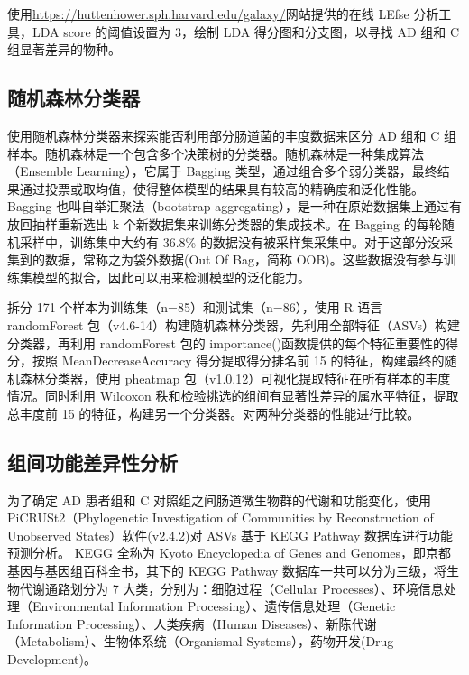 \documentclass[supercite]{HustGraduPaper}
\begin{document}
使用\href{https://huttenhower.sph.harvard.edu/galaxy/}{https://huttenhower.sph.harvard.edu/galaxy/}网站提供的在线 LEfse 分析工具，LDA score 的阈值设置为 3，绘制 LDA 得分图和分支图，以寻找 AD 组和 C 组显著差异的物种。

\subsection{随机森林分类器}

使用随机森林分类器来探索能否利用部分肠道菌的丰度数据来区分 AD 组和 C 组样本。随机森林是一个包含多个决策树的分类器\cite{liaw2002classification}。随机森林是一种集成算法（Ensemble Learning），它属于 Bagging 类型，通过组合多个弱分类器，最终结果通过投票或取均值，使得整体模型的结果具有较高的精确度和泛化性能。Bagging 也叫自举汇聚法（bootstrap aggregating），是一种在原始数据集上通过有放回抽样重新选出 k 个新数据集来训练分类器的集成技术。在 Bagging 的每轮随机采样中，训练集中大约有 36.8\% 的数据没有被采样集采集中。对于这部分没采集到的数据，常称之为袋外数据(Out Of Bag，简称 OOB)。这些数据没有参与训练集模型的拟合，因此可以用来检测模型的泛化能力。

拆分 171 个样本为训练集（n=85）和测试集（n=86），使用 R 语言 randomForest 包\cite{liaw2002classification}（v4.6-14）构建随机森林分类器，先利用全部特征（ASVs）构建分类器，再利用 randomForest 包的 importance()函数提供的每个特征重要性的得分，按照 MeanDecreaseAccuracy 得分提取得分排名前 15 的特征，构建最终的随机森林分类器，使用 pheatmap 包\cite{kolde2015package}（v1.0.12）可视化提取特征在所有样本的丰度情况。同时利用 Wilcoxon 秩和检验挑选的组间有显著性差异的属水平特征，提取总丰度前 15 的特征，构建另一个分类器。对两种分类器的性能进行比较。

\subsection{组间功能差异性分析}

为了确定 AD 患者组和 C 对照组之间肠道微生物群的代谢和功能变化，使用 PiCRUSt2（Phylogenetic Investigation of Communities by Reconstruction of Unobserved States）软件(v2.4.2)\cite{douglas2020picrust2}对 ASVs 基于 KEGG Pathway 数据库进行功能预测分析。 KEGG 全称为 Kyoto Encyclopedia of Genes and Genomes，即京都基因与基因组百科全书\cite{kanehisa2000kegg}，其下的 KEGG Pathway 数据库一共可以分为三级，将生物代谢通路划分为 7 大类，分别为：细胞过程（Cellular Processes）、环境信息处理（Environmental Information Processing）、遗传信息处理（Genetic Information Processing）、人类疾病（Human Diseases）、新陈代谢（Metabolism）、生物体系统（Organismal Systems），药物开发(Drug Development)。
\end{document}
